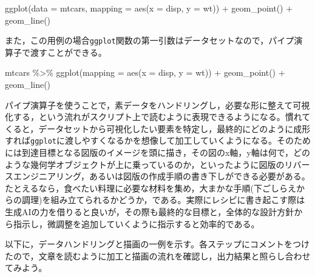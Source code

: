 \documentclass[
  a4paper,
]{ltjsbook}
\newenvironment{Shaded}{\begin{snugshade}}{\end{snugshade}}
\newcommand{\AttributeTok}[1]{\textcolor[rgb]{0.40,0.45,0.13}{#1}}
\newcommand{\FunctionTok}[1]{\textcolor[rgb]{0.28,0.35,0.67}{#1}}
\newcommand{\NormalTok}[1]{\textcolor[rgb]{0.00,0.23,0.31}{#1}}
\newcommand{\SpecialCharTok}[1]{\textcolor[rgb]{0.37,0.37,0.37}{#1}}
\begin{document}
\begin{Shaded}
\begin{Highlighting}[]
\FunctionTok{ggplot}\NormalTok{(}\AttributeTok{data =}\NormalTok{ mtcars, }\AttributeTok{mapping =} \FunctionTok{aes}\NormalTok{(}\AttributeTok{x =}\NormalTok{ disp, }\AttributeTok{y =}\NormalTok{ wt)) }\SpecialCharTok{+}
  \FunctionTok{geom\_point}\NormalTok{() }\SpecialCharTok{+}
  \FunctionTok{geom\_line}\NormalTok{()}
\end{Highlighting}
\end{Shaded}

また，この用例の場合\texttt{ggplot}関数の第一引数はデータセットなので，パイプ演算子で渡すことができる。

\begin{Shaded}
\begin{Highlighting}[]
\NormalTok{mtcars }\SpecialCharTok{\%\textgreater{}\%}
  \FunctionTok{ggplot}\NormalTok{(}\AttributeTok{mapping =} \FunctionTok{aes}\NormalTok{(}\AttributeTok{x =}\NormalTok{ disp, }\AttributeTok{y =}\NormalTok{ wt)) }\SpecialCharTok{+}
  \FunctionTok{geom\_point}\NormalTok{() }\SpecialCharTok{+}
  \FunctionTok{geom\_line}\NormalTok{()}
\end{Highlighting}
\end{Shaded}

パイプ演算子を使うことで，素データをハンドリングし，必要な形に整えて可視化する，という流れがスクリプト上で読むように表現できるようになる。慣れてくると，データセットから可視化したい要素を特定し，最終的にどのように成形すれば\texttt{ggplot}に渡しやすくなるかを想像して加工していくようになる。そのためには到達目標となる図版のイメージを頭に描き，その図のx軸，y軸は何で，どのような幾何学オブジェクトが上に乗っているのか，といったように図版のリバースエンジニアリング，あるいは図版の作成手順の書き下しができる必要がある。たとえるなら，食べたい料理に必要な材料を集め，大まかな手順(下ごしらえからの調理)を組み立てられるかどうか，である。実際にレシピに書き起こす際は生成AIの力を借りると良いが，その際も最終的な目標と，全体的な設計方針から指示し，微調整を追加していくように指示すると効率的である。

以下に，データハンドリングと描画の一例を示す。各ステップにコメントをつけたので，文章を読むように加工と描画の流れを確認し，出力結果と照らし合わせてみよう。
\end{document}
